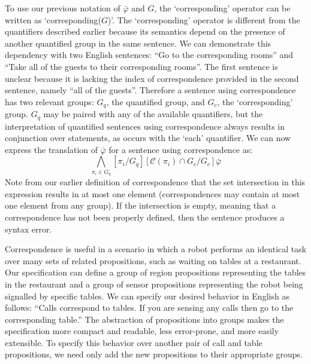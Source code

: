 To use our previous notation of $\bar{\varphi}$ and $G$, the `corresponding' operator can be written as `corresponding($G$)'. 
The `corresponding' operator is different from the quantifiers described earlier because its semantics depend on the presence of another quantified group in the same sentence. 
We can demonstrate this dependency with two English sentences: ``Go to the corresponding rooms'' and ``Take all of the guests to their corresponding rooms''.
The first sentence is unclear because it is lacking the index of correspondence provided in the second sentence, namely ``all of the guests''. 
Therefore a sentence using correspondence has two relevant groups: $G_q$, the quantified group, and $G_c$, the `corresponding' group. 
$G_q$ may be paired with any of the available quantifiers, but the interpretation of quantified sentences using correspondence always results in conjunction over statements, as occurs with the `each' quantifier. 
We can now express the translation of $\bar{\varphi}$ for a sentence using correspondence as:
\begin{equation*}
	\bigwedge \limits_{\pi_i \in G_q} [\pi_i / G_q] [\mathcal{C}(\pi_i) \cap G_c / G_c] \bar{\varphi}
\end{equation*}
Note from our earlier definition of correspondence that the set intersection in this expression results in at most one element (correspondences may contain at most one element from any group). 
If the intersection is empty, meaning that a correspondence has not been properly defined, then the sentence produces a syntax error. 

\begin{myExample}\label{Ex:corresponding}
	Correspondence is useful in a scenario in which a robot performs an identical task over many sets of related propositions, such as waiting on tables at a restaurant. 
	Our specification can define a group of region propositions representing the tables in the restaurant and a group of sensor propositions representing the robot being signalled by specific tables. We can specify our desired behavior in English as follows: 
	``Calls correspond to tables. 
	If you are sensing any calls then go to the corresponding table.''
	The abstraction of propositions into groups makes the specification more compact and readable, less error-prone, and more easily extensible. 
	To specify this behavior over another pair of call and table propositions, we need only add the new propositions to their appropriate groups. 
\end{myExample}
